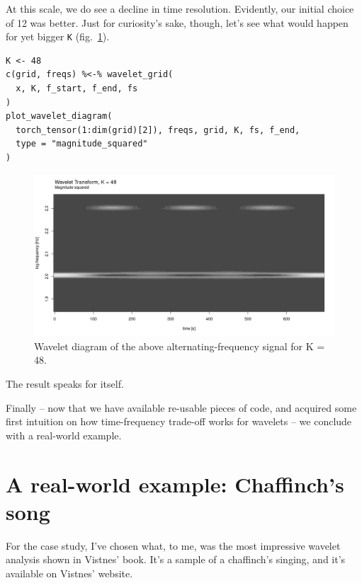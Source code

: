 \documentclass[
  letterpaper,
]{krantz}
\begin{document}
At this scale, we do see a decline in time resolution. Evidently, our
initial choice of 12 was better. Just for curiosity's sake, though,
let's see what would happen for yet bigger \texttt{K}
(fig.~\ref{fig-wav-example-long-diag6}).

\begin{verbatim}
K <- 48
c(grid, freqs) %<-% wavelet_grid(
  x, K, f_start, f_end, fs
)
plot_wavelet_diagram(
  torch_tensor(1:dim(grid)[2]), freqs, grid, K, fs, f_end,
  type = "magnitude_squared"
)
\end{verbatim}

\begin{figure}[H]

{\centering \includegraphics{images/wav-example-long-diag6.png}

}

\caption{\label{fig-wav-example-long-diag6}Wavelet diagram of the above
alternating-frequency signal for K = 48.}

\end{figure}

The result speaks for itself.

Finally -- now that we have available re-usable pieces of code, and
acquired some first intuition on how time-frequency trade-off works for
wavelets -- we conclude with a real-world example.

\hypertarget{a-real-world-example-chaffinchs-song}{%
\section{A real-world example: Chaffinch's
song}\label{a-real-world-example-chaffinchs-song}}

For the case study, I've chosen what, to me, was the most impressive
wavelet analysis shown in Vistnes' book. It's a sample of a chaffinch's
singing, and it's available on Vistnes' website.
\end{document}
